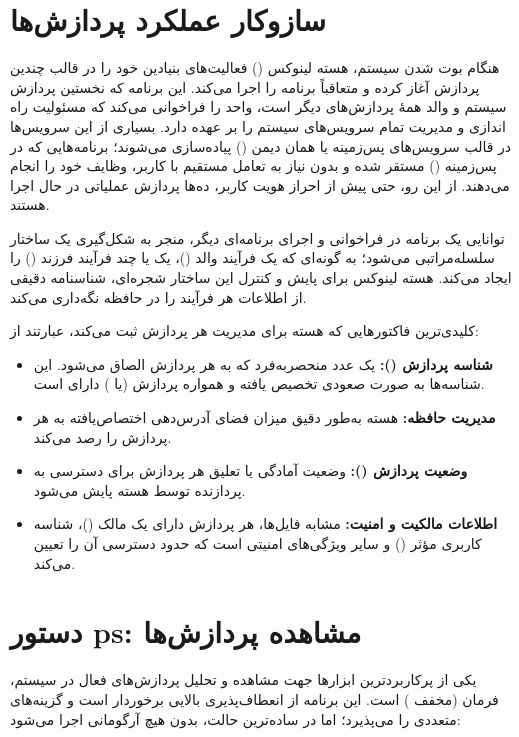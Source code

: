 \section{سازوکار عملکرد پردازش‌ها}

هنگام بوت شدن سیستم، هسته لینوکس () فعالیت‌های بنیادین خود را در قالب چندین پردازش آغاز کرده و متعاقباً برنامه  را اجرا می‌کند. این برنامه که نخستین پردازش سیستم و والد همهٔ پردازش‌های دیگر است، واحد  را فراخوانی می‌کند که مسئولیت راه اندازی و مدیریت تمام سرویس‌های سیستم را بر عهده دارد. بسیاری از این سرویس‌ها در قالب سرویس‌های پس‌زمینه یا همان دیمن () پیاده‌سازی می‌شوند؛ برنامه‌هایی که در پس‌زمینه () مستقر شده و بدون نیاز به تعامل مستقیم با کاربر، وظایف خود را انجام می‌دهند. از این رو، حتی پیش از احراز هویت کاربر، ده‌ها پردازش عملیاتی در حال اجرا هستند.

توانایی یک برنامه در فراخوانی و اجرای برنامه‌ای دیگر، منجر به شکل‌گیری یک ساختار سلسله‌مراتبی می‌شود؛ به گونه‌ای که یک فرآیند والد ()، یک یا چند فرآیند فرزند () را ایجاد می‌کند. هسته لینوکس برای پایش و کنترل این ساختار شجره‌ای، شناسنامه دقیقی از اطلاعات هر فرآیند را در حافظه نگه‌داری می‌کند.

کلیدی‌ترین فاکتورهایی که هسته برای مدیریت هر پردازش ثبت می‌کند، عبارتند از:

\begin{itemize}
  \item \textbf{شناسه پردازش ():} یک عدد منحصربه‌فرد که به هر پردازش الصاق می‌شود. این شناسه‌ها به صورت صعودی تخصیص یافته و همواره پردازش  (یا ) دارای  است.
  \item \textbf{مدیریت حافظه:} هسته به‌طور دقیق میزان فضای آدرس‌دهی اختصاص‌یافته به هر پردازش را رصد می‌کند.
  \item \textbf{وضعیت پردازش ():} وضعیت آمادگی یا تعلیق هر پردازش برای دسترسی به پردازنده توسط هسته پایش می‌شود.
  \item \textbf{اطلاعات مالکیت و امنیت:} مشابه فایل‌ها، هر پردازش دارای یک مالک ()، شناسه کاربری مؤثر () و سایر ویژگی‌های امنیتی است که حدود دسترسی آن را تعیین می‌کند.
\end{itemize}

\section{دستور ps: مشاهده پردازش‌ها}

یکی از پرکاربردترین ابزارها جهت مشاهده و تحلیل پردازش‌های فعال در سیستم، فرمان  (مخفف ) است. این برنامه از انعطاف‌پذیری بالایی برخوردار است و گزینه‌های متعددی را می‌پذیرد؛ اما در ساده‌ترین حالت، بدون هیچ آرگومانی اجرا می‌شود:

